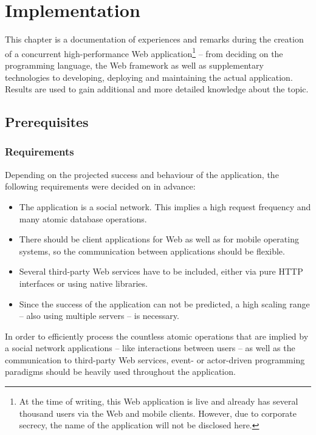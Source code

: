 \chapter{Implementation}
\label{sec:impl}
This chapter is a documentation of experiences and remarks during the creation of a concurrent high-performance Web application\footnote{At the time of writing, this Web application is live and already has several thousand users via the Web and mobile clients. However, due to corporate secrecy, the name of the application will not be disclosed here.} -- from deciding on the programming language, the Web framework as well as supplementary technologies to developing, deploying and maintaining the actual application. Results are used to gain additional and more detailed knowledge about the topic.

\section{Prerequisites}
\label{sec:prerequitites}
\subsection{Requirements}
Depending on the projected success and behaviour of the application, the following requirements were decided on in advance:

\begin{itemize}
  \item{The application is a social network. This implies a high request frequency and many atomic database operations.}
  \item{There should be client applications for Web as well as for mobile operating systems, so the communication between applications should be flexible.}
  \item{Several third-party Web services have to be included, either via pure HTTP interfaces or using native libraries.}
  \item{Since the success of the application can not be predicted, a high scaling range -- also using multiple servers -- is necessary.}
\end{itemize}

In order to efficiently process the countless atomic operations that are implied by a social network applications -- like interactions between users -- as well as the communication to third-party Web services, event- or actor-driven programming paradigms should be heavily used throughout the application.

